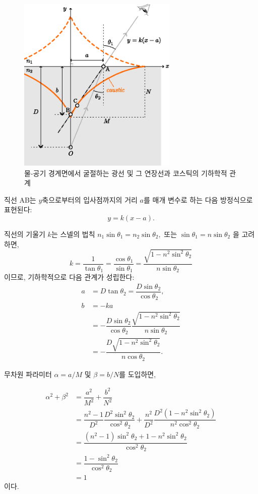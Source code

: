 \documentclass[twocolumn]{article}
\begin{document}
\begin{figure}
	\centering
	\includegraphics[width=3in]{figs/g237.eps}
	\caption{물-공기 경계면에서 굴절하는 광선 및 그 연장선과 코스틱의 기하학적 관계}
	\label{fig:geometry}
\end{figure}

 직선 AB는 $y$축으로부터의 입사점까지의 거리 $a$를 매개 변수로 하는 다음 방정식으로 표현된다:
$$y=k(x-a).$$

직선의 기울기 $k$는 스넬의 법칙
$ {n_1}\sin\theta_1 ={n_2} \sin\theta_2,$ 또는 $ \sin\theta_1 = n\sin\theta_2$
을 고려하면,
$$k=\dfrac{1}{\tan\theta_1}=\dfrac{\cos\theta_1}{\sin\theta_1}
	=\dfrac{\sqrt{1-n^2\sin^2\theta_2}}{n\sin\theta_2}$$
이므로,
기하학적으로 다음 관계가 성립한다:
$$\begin{aligned}
	a &= D\tan\theta_2 = \dfrac{D\sin\theta_2}{\cos\theta_2},\\
	b &= -ka \\
	&= -\dfrac{D\sin\theta_2}{\cos\theta_2}
	\dfrac{\sqrt{1-n^2\sin^2\theta_2}}{n\sin\theta_2}\\
	&=-\dfrac{D\sqrt{1-n^2\sin^2\theta_2}}{n\cos\theta_2}.
\end{aligned}$$

무차원 파라미터 $\alpha=a/M$ 및 $\beta=b/N$를 도입하면,

$$ \begin{aligned}
	\alpha^2 + \beta^2 &= \dfrac{a^2}{M^2}+\dfrac{b^2}{N^2}\\
	&=\dfrac{n^2-1}{D^2}\dfrac{D^2\sin^2\theta_2}{\cos^2\theta_2}%
	+\dfrac{n^2}{D^2}\dfrac{D^2(1-n^2\sin^2\theta_2)}{n^2\cos^2\theta_2}\\
	&=\dfrac{\left(n^2-1\right)\sin^2\theta_2 + 1-n^2\sin^2\theta_2}
	{\cos^2\theta_2}\\
	&=\dfrac{1-\sin^2\theta_2}{\cos^2\theta_2}\\
	&= 1
\end{aligned}$$
%
이다. 
\end{document}
